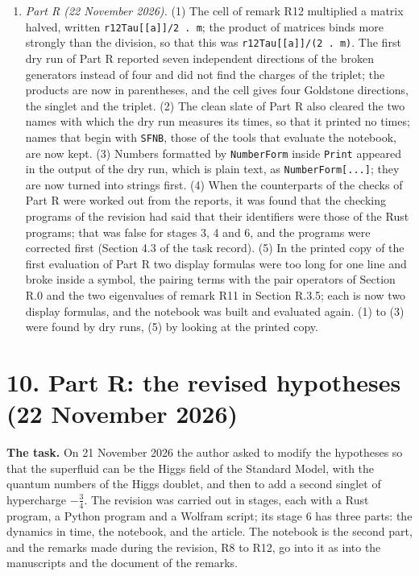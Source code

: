 \documentclass[
  10pt,
]{article}
\begin{document}
\begin{enumerate}
  2026: ALL PASS (181 of 181), 0 messages. Since this evaluation the
  counts of the builder are no longer typed in Section 4 but written
  from its report.
\item
  \emph{Part R (22 November 2026).} (1) The cell of remark R12
  multiplied a matrix halved, written
  \texttt{r12Tau{[}{[}a{]}{]}/2\ .\ m}; the product of matrices binds
  more strongly than the division, so that this was
  \texttt{r12Tau{[}{[}a{]}{]}/(2\ .\ m)}. The first dry run of Part R
  reported seven independent directions of the broken generators instead
  of four and did not find the charges of the triplet; the products are
  now in parentheses, and the cell gives four Goldstone directions, the
  singlet and the triplet. (2) The clean slate of Part R also cleared
  the two names with which the dry run measures its times, so that it
  printed no times; names that begin with \texttt{SFNB}, those of the
  tools that evaluate the notebook, are now kept. (3) Numbers formatted
  by \texttt{NumberForm} inside \texttt{Print} appeared in the output of
  the dry run, which is plain text, as \texttt{NumberForm{[}...{]}};
  they are now turned into strings first. (4) When the counterparts of
  the checks of Part R were worked out from the reports, it was found
  that the checking programs of the revision had said that their
  identifiers were those of the Rust programs; that was false for stages
  3, 4 and 6, and the programs were corrected first (Section 4.3 of the
  task record). (5) In the printed copy of the first evaluation of Part
  R two display formulas were too long for one line and broke inside a
  symbol, the pairing terms with the pair operators of Section R.0 and
  the two eigenvalues of remark R11 in Section R.3.5; each is now two
  display formulas, and the notebook was built and evaluated again. (1)
  to (3) were found by dry runs, (5) by looking at the printed copy.
\end{enumerate}

\hypertarget{part-r-the-revised-hypotheses-22-november-2026}{%
\section{10. Part R: the revised hypotheses (22 November
2026)}\label{part-r-the-revised-hypotheses-22-november-2026}}

\textbf{The task.} On 21 November 2026 the author asked to modify the
hypotheses so that the superfluid can be the Higgs field of the Standard
Model, with the quantum numbers of the Higgs doublet, and then to add a
second singlet of hypercharge \(-\tfrac34\). The revision was carried
out in stages, each with a Rust program, a Python program and a Wolfram
script; its stage 6 has three parts: the dynamics in time, the notebook,
and the article. The notebook is the second part, and the remarks made
during the revision, R8 to R12, go into it as into the manuscripts and
the document of the remarks.
\end{document}
